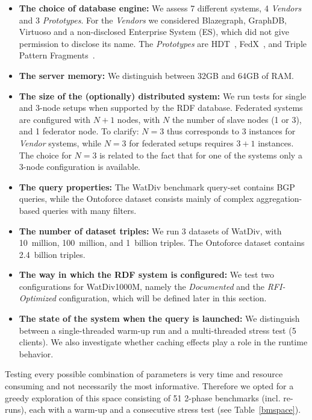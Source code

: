 \begin{itemize}
	\item \textbf{The choice of database engine:} We assess 7 different systems, 4 \emph{Vendors} and 3 \emph{Prototypes}. For the \emph{Vendors} we considered Blazegraph, GraphDB, Virtuoso and a non-disclosed Enterprise System (ES), which did not give permission to disclose its name. The \emph{Prototypes} are HDT~\cite{DBLP:journals/ws/FernandezMGPA13}, FedX~\cite{DBLP:conf/semweb/SchwarteHHSS11}, and Triple Pattern Fragments~\cite{DBLP:conf/semweb/VerborghHMHVSCCMW14}.
	\item \textbf{The server memory:} We distinguish between 32GB and 64GB of RAM.
	\item \textbf{The size of the (optionally) distributed system:} We run tests for single and 3-node setups when supported by the RDF database. Federated systems are configured with $N+1$ nodes, with $N$ the number of slave nodes (1 or 3), and 1 federator node. To clarify: $N=3$ thus corresponds to 3 instances for \emph{Vendor} systems, while $N=3$ for federated setups requires $3+1$ instances. The choice for $N=3$ is related to the fact that for one of the systems only a 3-node configuration is available.
	\item \textbf{The query properties:} The WatDiv benchmark query-set contains BGP queries, while the Ontoforce dataset consists mainly of complex aggregation-based queries with many filters.
	\item \textbf{The number of dataset triples:} We run 3 datasets of WatDiv, with 10~million, 100~million, and 1~billion triples. The Ontoforce dataset contains 2.4~billion triples.
	\item \textbf{The way in which the RDF system is configured:} We test two configurations for WatDiv1000M, namely the \emph{Documented} and the \emph{RFI-Optimized} configuration, which will be defined later in this section. 
	\item \textbf{The state of the system when the query is launched:} We distinguish between a single-threaded warm-up run and a multi-threaded stress test (5 clients). We also investigate whether caching effects play a role in the runtime behavior.
\end{itemize} 

Testing every possible combination of parameters is very time and resource consuming and not necessarily the most informative. Therefore we opted for a greedy exploration of this space consisting of 51 2-phase  benchmarks (incl. re-runs), each with a warm-up and a consecutive stress test (see Table~\ref{bmspace}).

